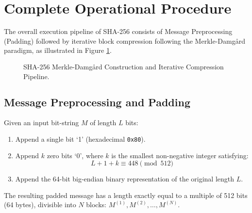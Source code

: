\section{Complete Operational Procedure}
The overall execution pipeline of SHA-256 consists of Message Preprocessing (Padding) followed by iterative block compression following the Merkle-Damg{\aa}rd paradigm, as illustrated in Figure \ref{fig:sha_pipeline}.

\begin{figure}[htbp]
\centering
{}
\caption{SHA-256 Merkle-Damg{\aa}rd Construction and Iterative Compression Pipeline.}
\label{fig:sha_pipeline}
\end{figure}

\subsection{Message Preprocessing and Padding}
Given an input bit-string $M$ of length $L$ bits:
\begin{enumerate}
    \item Append a single bit `1' (hexadecimal \texttt{0x80}).
    \item Append $k$ zero bits `0', where $k$ is the smallest non-negative integer satisfying:
    \begin{equation}
    L + 1 + k \equiv 448 \pmod{512}
    \end{equation}
    \item Append the 64-bit big-endian binary representation of the original length $L$.
\end{enumerate}
The resulting padded message has a length exactly equal to a multiple of 512 bits (64 bytes), divisible into $N$ blocks: $M^{(1)}, M^{(2)}, \dots, M^{(N)}$.

